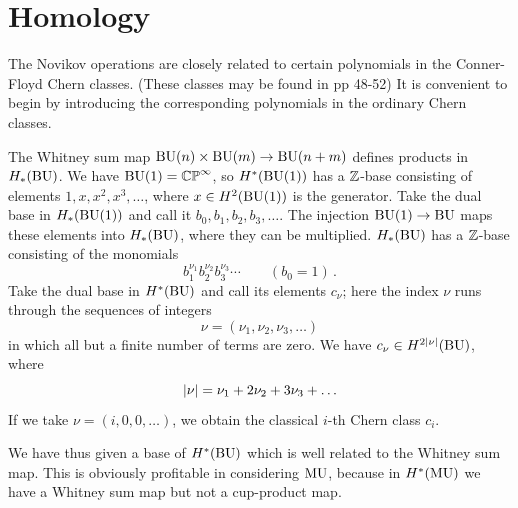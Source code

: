 \documentclass[../main]{subfiles}
\begin{document}
\chapter{Homology}
\label{sec:p1c3}

The Novikov operations are closely related to certain polynomials in the Conner-Floyd Chern classes. 
(These classes may be found in \cite{connerfloyd} pp 48-52) 
It is convenient to begin by introducing the corresponding polynomials in the ordinary Chern classes.

The Whitney sum map $\mathrm{BU}(n) \times \mathrm{BU}(m) \to \mathrm{BU}(n+m)$ defines products in $H_{\ast}(\operatorname{BU})$.
We have $\mathrm{BU}(1) = \mathbb{CP}^{\infty}$, so $H^*(\mathrm{BU}(1))$ has a $\mathbb{Z}$-base consisting of elements $1, x, x^{2}, x^{3}, \ldots$, where $x \in H^{2}(\mathrm{BU}(1))$ is the generator. 
Take the dual base in $H_{\ast}(\mathrm{BU}(1))$ and call it $b_0, b_1, b_2, b_3, \ldots$.
The injection $\mathrm{BU}(1) \to \operatorname{BU}$ maps these elements into $H_{\ast}(\operatorname{BU})$, where they can be multiplied. 
$H_{\ast}(\operatorname{BU})$ has a $\mathbb{Z}$-base consisting of the monomials 
\begin{equation*}
	b_1^{\nu_1}b_2^{\nu_2}b_3^{\nu_3}\cdots \qquad (b_0=1)\,.
\end{equation*}
Take the dual base in $H^*(\operatorname{BU})$ and call its elements $c_{\nu}$; here the index $\nu$ runs through the sequences of integers 
\begin{equation*}
	\nu = (\nu_1, \nu_2, \nu_3, \ldots)
\end{equation*}
in which all but a finite number of terms are zero. 
We have $c_{\nu}\in H^{2\lvert\nu\rvert}(\operatorname{BU})$, where 
\begin{equation*}
	\lvert\nu\rvert = \nu_1 + 2\nu_2+ 3\nu_3+ \ldots
\end{equation*} 
If we take $\nu = (i, 0, 0, \ldots)$, we obtain the classical $i$-th Chern class $c_{i}$. %

We have thus given a base of $H^*(\operatorname{BU})$ which is well related to the Whitney sum map. 
This is obviously profitable in considering $\operatorname{MU}$, because in $H^*(\operatorname{MU})$ we have a Whitney sum map but not a cup-product map. 
\end{document}
